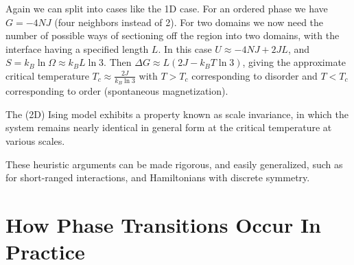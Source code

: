 \documentclass[12pt, a4paper, oneside, openright, titlepage]{book}
\begin{document}
\begin{eg}
    Again we can split into cases like the 1D case. For an ordered phase we have $G = -4NJ$ (four neighbors instead of 2). For two domains we now need the number of possible ways of sectioning off the region into two domains, with the interface having a specified length $L$. In this case $U \approx -4NJ +2JL$, and $S = k_B\ln\Omega \approx k_BL\ln 3$. Then $\Delta G \approx L(2J - k_BT\ln 3)$, giving the approximate critical temperature $T_c \approx \frac{2J}{k_B\ln 3}$ with $T > T_c$ corresponding to disorder and $T < T_c$ corresponding to order (spontaneous magnetization).
\end{eg}

\begin{rmk}
    The (2D) Ising model exhibits a property known as scale invariance, in which the system remains nearly identical in general form at the critical temperature at various scales.
\end{rmk}



These heuristic arguments can be made rigorous, and easily generalized, such as for short-ranged interactions, and Hamiltonians with discrete symmetry.


\section{How Phase Transitions Occur In Practice}
\end{document}
